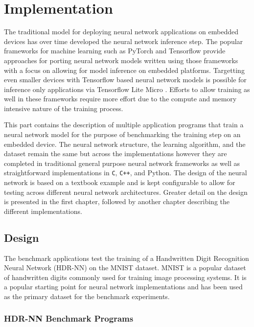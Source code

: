 \part{Implementation}

The traditional model for deploying neural network applications on embedded devices has over time developed the neural network inference step. The popular frameworks for machine learning such as PyTorch and Tensorflow provide approaches for porting neural network models written using those frameworks with a focus on allowing for model inference on embedded platforms. Targetting even smaller devices with Tensorflow based neural network models is possible for inference only applications via Tensorflow Lite Micro \cite{tflm}. Efforts to allow training as well in these frameworks require more effort due to the compute and memory intensive nature of the training process.

This part contains the description of multiple application programs that train a neural network model for the purpose of benchmarking the training step on an embedded device. The neural network structure, the learning algorithm, and the dataset remain the same but across the implementations however they are completed in traditional general purpose neural network frameworks as well as straightforward implementations in \texttt{C}, \texttt{C++}, and Python. The design of the neural network is based on a textbook example and is kept configurable to allow for testing across different neural network architectures. Greater detail on the design is presented in the first chapter, followed by another chapter describing the different implementations.


\chapter{Design}

The benchmark applications test the training of a Handwritten Digit Recognition Neural Network (HDR-NN) on the MNIST \cite{mnist} dataset. MNIST is a popular dataset of handwritten digits commonly used for training image processing systems. It is a popular starting point for neural network implementations and has been used as the primary dataset for the benchmark experiments.

\section[Handwritten Digit Recognition (HDR)]{HDR-NN Benchmark Programs}

